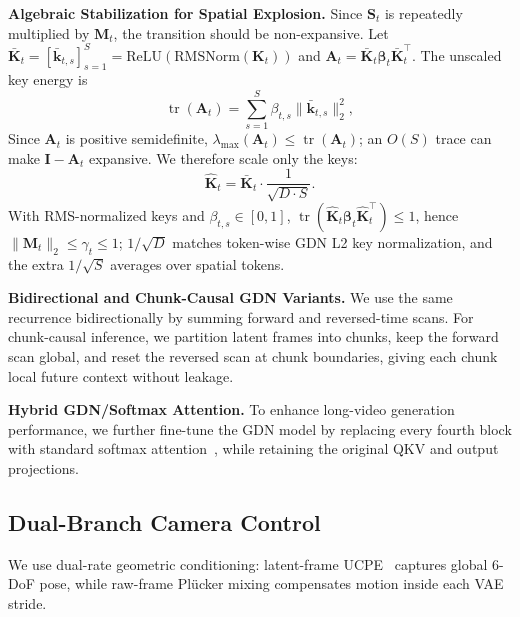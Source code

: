 \documentclass{llmxive}
\begin{document}
\noindent \textbf{Algebraic Stabilization for Spatial Explosion.}
Since $\mathbf{S}_t$ is repeatedly multiplied by $\mathbf{M}_t$, the transition should be non-expansive.
Let $\bar{\mathbf{K}}_t=[\bar{\mathbf{k}}_{t,s}]_{s=1}^{S}=\mathrm{ReLU}(\mathrm{RMSNorm}(\mathbf{K}_t))$ and $\mathbf{A}_t=\bar{\mathbf{K}}_t\boldsymbol{\beta}_t\bar{\mathbf{K}}_t^\top$.
The unscaled key energy is
\begin{equation}
\label{eq:gdn_key_mass}
\operatorname{tr}(\mathbf{A}_t)
=\sum_{s=1}^{S}\beta_{t,s}\|\bar{\mathbf{k}}_{t,s}\|_2^2 ,
\end{equation}
Since $\mathbf{A}_t$ is positive semidefinite, $\lambda_{\max}(\mathbf{A}_t)\le\operatorname{tr}(\mathbf{A}_t)$; an $O(S)$ trace can make $\mathbf{I}-\mathbf{A}_t$ expansive.
We therefore scale only the keys:
\begin{equation}
\label{eq:k_scale}
\hat{\mathbf{K}}_t = \bar{\mathbf{K}}_t \cdot \frac{1}{\sqrt{D \cdot S}} .
\end{equation}
With RMS-normalized keys and $\beta_{t,s}\in[0,1]$, $\operatorname{tr}(\hat{\mathbf{K}}_t\boldsymbol{\beta}_t\hat{\mathbf{K}}_t^\top)\le1$, hence $\|\mathbf{M}_t\|_2\le\gamma_t\le1$; $1/\sqrt{D}$ matches token-wise GDN L2 key normalization, and the extra $1/\sqrt{S}$ averages over spatial tokens.

\noindent \textbf{Bidirectional and Chunk-Causal GDN Variants.}
We use the same recurrence bidirectionally by summing forward and reversed-time scans. For chunk-causal inference, we partition latent frames into chunks, keep the forward scan global, and reset the reversed scan at chunk boundaries, giving each chunk local future context without leakage.

\noindent \textbf{Hybrid GDN/Softmax Attention.}
To enhance long-video generation performance, we further fine-tune the GDN model by replacing every fourth block with standard softmax attention~\citep{flash_attention2}, while retaining the original QKV and output projections.


\subsection{Dual-Branch Camera Control}
\label{sec:camera_control}

We use dual-rate geometric conditioning: latent-frame UCPE~\citep{ucpe} captures global 6-DoF pose, while raw-frame Pl\"ucker mixing compensates motion inside each VAE stride.
\end{document}
